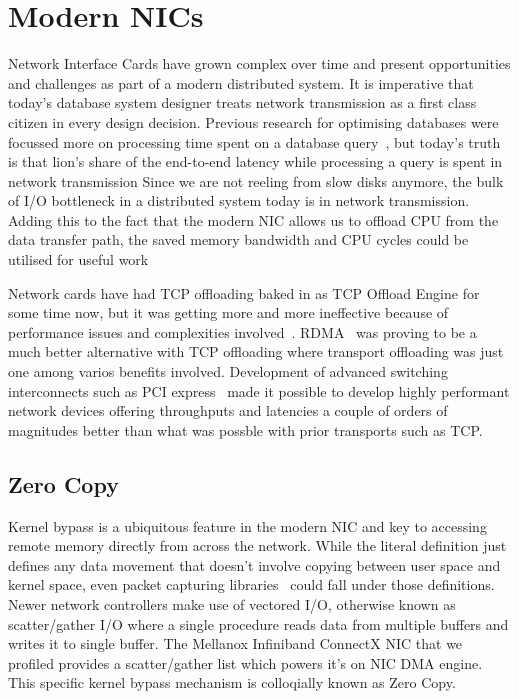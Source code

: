 
\chapter{Modern NICs}
Network Interface Cards have grown complex over time and present opportunities and 
challenges as part of a modern distributed system. It is imperative that today's
database system designer treats network transmission as a first class citizen in every design decision.
Previous research for optimising databases were focussed more on processing time spent on a 
database query~\cite{dbmsproctime}, but today's truth is that lion's share of the end-to-end latency
while processing a query is spent in network transmission
Since we are not reeling from slow disks anymore, the bulk of I/O bottleneck in a distributed system today is in network transmission.
Adding this to the fact that the modern NIC allows us to offload CPU from the data transfer path,
the saved memory bandwidth and CPU cycles could be utilised for useful work 

Network cards have had TCP offloading baked in as TCP Offload Engine for some time now, but it was getting 
more and more ineffective because of performance issues and complexities involved~\cite{tcpoffload}.
RDMA~\cite{rdmapatent,rdmacase,rdma} was proving to be a much better alternative with TCP offloading where
transport offloading was just one among varios benefits involved. Development of advanced switching 
interconnects such as PCI express~\cite{pcie} made it possible to develop highly performant 
network devices offering throughputs and latencies a couple of orders of magnitudes better
than what was possble with prior transports such as TCP.


\section{Zero Copy}
Kernel bypass is a ubiquitous feature in the modern NIC and key to accessing remote memory directly 
from across the network. While the literal definition just defines any data movement that doesn't 
involve copying between user space and kernel space, even packet capturing libraries~\cite{pcap} could fall
under those definitions. Newer network controllers make use of vectored I/O, otherwise known as scatter/gather I/O
where a single procedure reads data from multiple buffers and writes it to single buffer. The Mellanox Infiniband ConnectX
NIC that we profiled provides a scatter/gather list which powers it's on NIC DMA engine. This specific kernel bypass
mechanism is colloqially known as Zero Copy.

